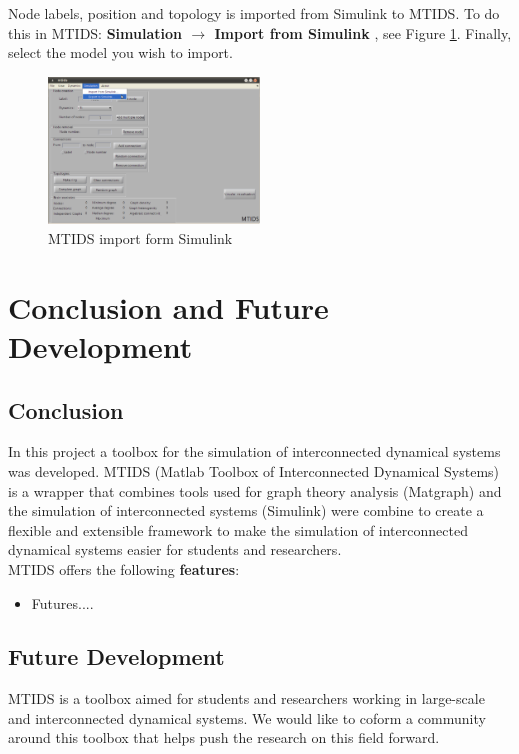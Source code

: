 \documentclass[a4paper,twoside, openright,12pt]{report}
\begin{document}
 Node labels, position and topology is imported from Simulink to MTIDS.
To do this in MTIDS: \textbf{Simulation $\rightarrow$ Import from Simulink }, see Figure \ref{mtidsImportFig}. Finally, select the model you wish to import.

\begin{figure}[htb]
\centering
\includegraphics[width=0.5\textwidth]{pics/mtidsImport.eps}
\caption[MTIDS import form Simulink]{MTIDS import form Simulink}
\label{mtidsImportFig}
\end{figure} 



\chapter{Conclusion and Future Development}

\section{Conclusion}
In this project a toolbox for the simulation of interconnected dynamical systems was developed. MTIDS (Matlab Toolbox of Interconnected Dynamical Systems) is a wrapper that 
combines tools used for graph theory analysis (Matgraph) and the simulation of interconnected systems (Simulink) were combine to create a flexible and extensible 
framework to make the simulation of interconnected dynamical systems easier for students and researchers.\\

MTIDS offers the following \textbf{features}:
\begin{itemize}
 \item Futures....
\end{itemize}




\section{Future Development}

MTIDS is a toolbox aimed for students and researchers working in large-scale and interconnected dynamical systems. We would like to coform a community 
around this toolbox that helps push the research on this field forward.
\end{document}
